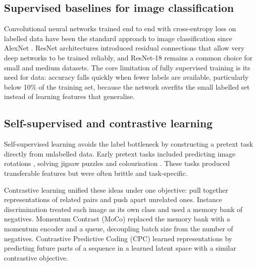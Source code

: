 \documentclass[11pt,a4paper]{article}
\begin{document}
\subsection{Supervised baselines for image classification}
Convolutional neural networks trained end to end with cross-entropy loss on labelled data have been the
standard approach to image classification since AlexNet \citep{krizhevsky2012}. ResNet architectures
\citep{he2016} introduced residual connections that allow very deep networks to be trained reliably, and
ResNet-18 remains a common choice for small and medium datasets. The core limitation of fully supervised
training is its need for data: accuracy falls quickly when fewer labels are available, particularly below
10\% of the training set, because the network overfits the small labelled set instead of learning features
that generalise.

\subsection{Self-supervised and contrastive learning}
Self-supervised learning avoids the label bottleneck by constructing a pretext task directly from unlabelled
data. Early pretext tasks included predicting image rotations \citep{gidaris2018}, solving jigsaw puzzles
\citep{noroozi2016} and colourisation \citep{zhang2016}. These tasks produced transferable features but were
often brittle and task-specific.

Contrastive learning unified these ideas under one objective: pull together representations of related pairs
and push apart unrelated ones. Instance discrimination \citep{wu2018} treated each image as its own class and
used a memory bank of negatives. Momentum Contrast (MoCo) \citep{he2020} replaced the memory bank with a
momentum encoder and a queue, decoupling batch size from the number of negatives. Contrastive Predictive
Coding (CPC) \citep{oord2018} learned representations by predicting future parts of a sequence in a learned
latent space with a similar contrastive objective.
\end{document}
